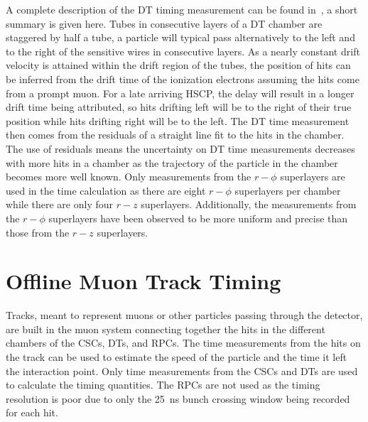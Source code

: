 A complete description of the DT timing measurement can be found in~\cite{2007AN049}, a short summary is given here.
Tubes in consecutive layers of a DT chamber are staggered by half a tube, a particle will typical pass alternatively to the left and to the right of the
sensitive wires in consecutive layers.
As a nearly constant drift velocity is attained within the drift region of the tubes,
the position of hits can be inferred from the drift time of the ionization electrons assuming the hits come from a prompt muon.
For a late arriving HSCP, the delay will result in a longer drift time being attributed, so hits drifting
left will be to the right of their true position while hits drifting right will be to the left.
The DT time measurement then comes from the residuals of a straight line fit to the hits in the chamber.
The use of residuals means the uncertainty on DT time measurements decreases with more hits in a chamber as the trajectory of the particle in the
chamber becomes more well known. Only measurements from the $r-\phi$ superlayers are used in the time calculation as there are eight $r-\phi$ superlayers
per chamber while there are only four $r-z$ superlayers. Additionally, the measurements from the $r-\phi$ superlayers have been observed to be more uniform and precise than
those from the $r-z$ superlayers.

\section{Offline Muon Track Timing}

Tracks, meant to represent muons or other particles passing through the detector, are built in the muon system connecting together the hits in the different chambers of
the CSCs, DTs, and RPCs. The time measurements from the hits on the track can be used to estimate the speed of the particle and the time it left the interaction point.
Only time measurements from the CSCs and DTs are used to calculate the timing quantities. The RPCs are not used as the timing resolution is poor due to only the
25~ns bunch crossing window being recorded for each hit.

